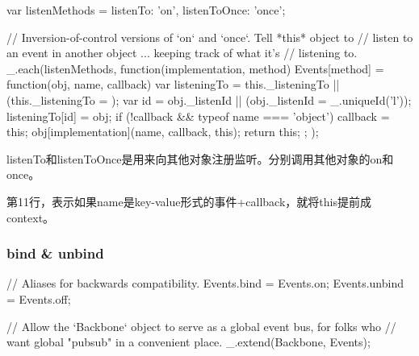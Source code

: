 \begin{JavaScript}
  var listenMethods = {listenTo: 'on', listenToOnce: 'once'};

  // Inversion-of-control versions of `on` and `once`. Tell *this* object to
  // listen to an event in another object ... keeping track of what it's
  // listening to.
  _.each(listenMethods, function(implementation, method) {
    Events[method] = function(obj, name, callback) {
      var listeningTo = this._listeningTo || (this._listeningTo = {});
      var id = obj._listenId || (obj._listenId = _.uniqueId('l'));
      listeningTo[id] = obj;
      if (!callback && typeof name === 'object') callback = this;
      obj[implementation](name, callback, this);
      return this;
    };
  });
\end{JavaScript}

listenTo和listenToOnce是用来向其他对象注册监听。分别调用其他对象的on和once。

第11行，表示如果name是key-value形式的事件+callback，就将this提前成context。

\subsubsection{bind \& unbind}

\begin{JavaScript}
  // Aliases for backwards compatibility.
  Events.bind   = Events.on;
  Events.unbind = Events.off;
\end{JavaScript}


\begin{JavaScript}
  // Allow the `Backbone` object to serve as a global event bus, for folks who
  // want global "pubsub" in a convenient place.
  _.extend(Backbone, Events);
\end{JavaScript}

